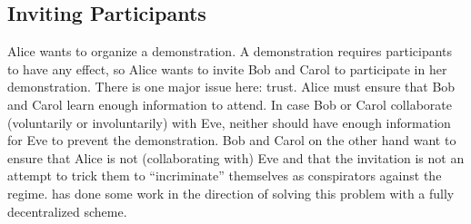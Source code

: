 \subsection{Inviting Participants}
\label{InvitingParticipants}

%
%
%

Alice wants to organize a demonstration.
A demonstration requires participants to have any effect, so Alice wants to 
invite Bob and Carol to participate in her demonstration.
There is one major issue here: trust.
Alice must ensure that Bob and Carol learn enough information to attend.
In case Bob or Carol collaborate (voluntarily or involuntarily) with Eve, 
neither should have enough information for Eve to prevent the demonstration.
Bob and Carol on the other hand want to ensure that Alice is not 
(collaborating with) Eve and that the invitation is not an attempt to trick 
them to \enquote{incriminate} themselves as conspirators against the regime.
\Textcite{EventsInvitations} has done some work in the direction of solving 
this problem with a fully decentralized scheme.

